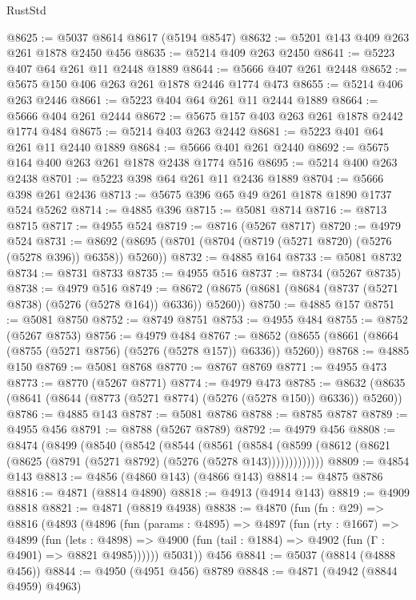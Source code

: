 \begin{lexlean}{RustStd}
\begin{coremodule}
@8625 := @5037 @8614 @8617 (@5194 @8547)
@8632 := @5201 @143 @409 @263 @261 @1878 @2450 @456
@8635 := @5214 @409 @263 @2450
@8641 := @5223 @407 @64 @261 @11 @2448 @1889
@8644 := @5666 @407 @261 @2448
@8652 := @5675 @150 @406 @263 @261 @1878 @2446 @1774 @473
@8655 := @5214 @406 @263 @2446
@8661 := @5223 @404 @64 @261 @11 @2444 @1889
@8664 := @5666 @404 @261 @2444
@8672 := @5675 @157 @403 @263 @261 @1878 @2442 @1774 @484
@8675 := @5214 @403 @263 @2442
@8681 := @5223 @401 @64 @261 @11 @2440 @1889
@8684 := @5666 @401 @261 @2440
@8692 := @5675 @164 @400 @263 @261 @1878 @2438 @1774 @516
@8695 := @5214 @400 @263 @2438
@8701 := @5223 @398 @64 @261 @11 @2436 @1889
@8704 := @5666 @398 @261 @2436
@8713 := @5675 @396 @65 @49 @261 @1878 @1890 @1737 @524 @5262
@8714 := @4885 @396
@8715 := @5081 @8714
@8716 := @8713 @8715
@8717 := @4955 @524
@8719 := @8716 (@5267 @8717)
@8720 := @4979 @524
@8731 := @8692 (@8695 (@8701 (@8704 (@8719 (@5271 @8720) (@5276 (@5278 @396)) @6358)) @5260))
@8732 := @4885 @164
@8733 := @5081 @8732
@8734 := @8731 @8733
@8735 := @4955 @516
@8737 := @8734 (@5267 @8735)
@8738 := @4979 @516
@8749 := @8672 (@8675 (@8681 (@8684 (@8737 (@5271 @8738) (@5276 (@5278 @164)) @6336)) @5260))
@8750 := @4885 @157
@8751 := @5081 @8750
@8752 := @8749 @8751
@8753 := @4955 @484
@8755 := @8752 (@5267 @8753)
@8756 := @4979 @484
@8767 := @8652 (@8655 (@8661 (@8664 (@8755 (@5271 @8756) (@5276 (@5278 @157)) @6336)) @5260))
@8768 := @4885 @150
@8769 := @5081 @8768
@8770 := @8767 @8769
@8771 := @4955 @473
@8773 := @8770 (@5267 @8771)
@8774 := @4979 @473
@8785 := @8632 (@8635 (@8641 (@8644 (@8773 (@5271 @8774) (@5276 (@5278 @150)) @6336)) @5260))
@8786 := @4885 @143
@8787 := @5081 @8786
@8788 := @8785 @8787
@8789 := @4955 @456
@8791 := @8788 (@5267 @8789)
@8792 := @4979 @456
@8808 := @8474
    (@8499
      (@8540
        (@8542
          (@8544
            (@8561
              (@8584
                (@8599 (@8612 (@8621 (@8625 (@8791 (@5271 @8792) (@5276 (@5278 @143)))))))))))))
@8809 := @4854 @143
@8813 := @4856 (@4860 @143) (@4866 @143)
@8814 := @4875 @8786
@8816 := @4871 (@8814 @4890)
@8818 := @4913 (@4914 @143)
@8819 := @4909 @8818
@8821 := @4871 (@8819 @4938)
@8838 := @4870
    (fun (fn : @29) =>
    @8816
      (@4893
        (@4896
          (fun (params : @4895) =>
          @4897
            (fun (rty : @1667) =>
            @4899
              (fun (lets : @4898) =>
              @4900 (fun (tail : @1884) => @4902 (fun (Γ : @4901) => @8821 @4985))))))
        @5031))
    @456
@8841 := @5037 (@8814 (@4888 @456))
@8844 := @4950 (@4951 @456) @8789
@8848 := @4871 (@4942 (@8844 @4959) @4963)

\end{coremodule}
\end{lexlean}
